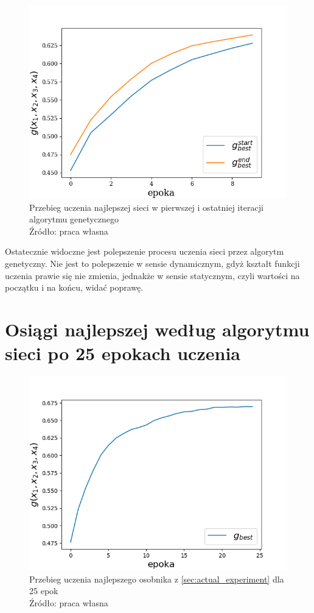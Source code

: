 \begin{figure}[h!tb]
	 \centering
	 \includegraphics[width = 0.85\linewidth]{img/iter_learn_best}
	 \caption{Przebieg uczenia najlepszej sieci w pierwszej i ostatniej iteracji algorytmu genetycznego\\
              Źródło: praca własna}
	 \label{fig:iter_learn_best}
\end{figure}

Ostatecznie widoczne jest polepszenie procesu uczenia sieci przez algorytm genetyczny.
Nie jest to polepszenie w sensie dynamicznym, gdyż kształt funkcji uczenia prawie się nie zmienia, jednakże w sensie statycznym, czyli wartości na początku i na końcu, widać poprawę.

\section{Osiągi najlepszej według algorytmu sieci po 25 epokach uczenia}\label{sec:25_epoch_training}
\begin{figure}[h!tb]
	 \centering
	 \includegraphics[width = 0.85\linewidth]{img/25epoch}
	 \caption{Przebieg uczenia najlepszego osobnika z \ref{sec:actual_experiment} dla 25 epok\\
              Źródło: praca własna}
	 \label{fig:25epoch}
\end{figure}


